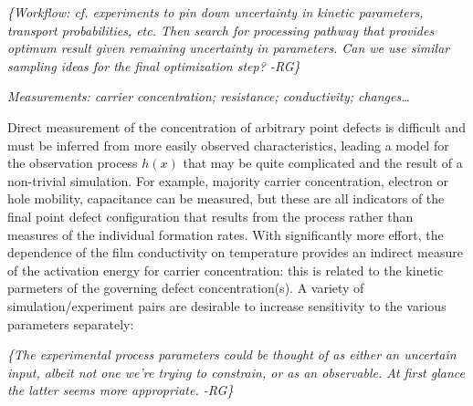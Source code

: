 \documentclass[11pt]{article}
\newcommand{\remrg}[1]{ {\it \color{drkgrn} \{#1 -RG\}}}
\begin{document}
\remrg{Workflow: cf. experiments to pin down uncertainty in kinetic
parameters, transport probabilities, etc. Then search for processing
pathway that provides optimum result given remaining uncertainty in
parameters. Can we use similar sampling ideas for the final
  optimization step?}

\emph{Measurements: carrier concentration; resistance; conductivity;
  changes\ldots}


%


Direct measurement of the concentration of arbitrary point defects is
difficult and must be inferred from more easily observed
characteristics, leading a model for the observation process $h(x)$
that may be quite complicated and the result of a non-trivial
simulation.  For example, majority carrier concentration, electron or
hole mobility, capacitance can be measured, but these are all
indicators of the final point defect configuration that results from
the process rather than measures of the individual formation
rates. With significantly more effort, the dependence of the film
conductivity on temperature provides an indirect measure of the
activation energy for carrier concentration: this is related to the
kinetic parmeters of the governing defect concentration(s).  A variety
of simulation/experiment pairs are desirable to increase sensitivity
to the various parameters separately:



\remrg{The experimental process parameters could be
  thought of as either an uncertain input, albeit not one we're
  trying to constrain, or as an observable. At first glance the latter
  seems more appropriate.}
\end{document}

